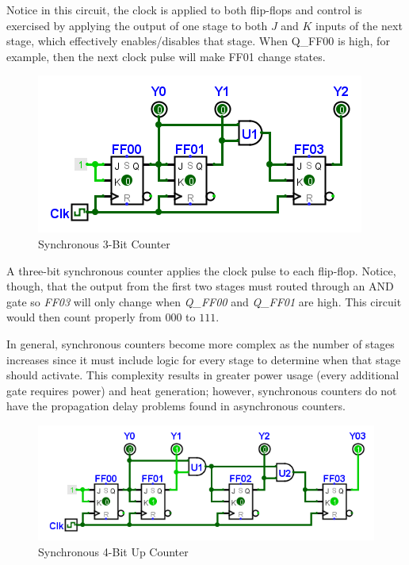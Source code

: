 Notice in this circuit, the clock is applied to both flip-flops and control is exercised by applying the output of one stage to both $ J $ and $ K $ inputs of the next stage, which effectively enables/disables that stage. When Q\_FF00 is high, for example, then the next clock pulse will make FF01 change states. 

\begin{figure}[H]
	\centering
	\includegraphics[width=\maxwidth{.95\linewidth}]{gfx/09_14}
	\caption{Synchronous 3-Bit Counter}
	\label{fig:09_14}
\end{figure}

A three-bit synchronous counter applies the clock pulse to each flip-flop. Notice, though, that the output from the first two stages must routed through an \textsf{AND} gate so \emph{FF03} will only change when \emph{Q\_FF00} and \emph{Q\_FF01} are high. This circuit would then count properly from $ 000 $ to $ 111 $. 

In general, synchronous counters become more complex as the number of stages increases since it must include logic for every stage to determine when that stage should activate. This complexity results in greater power usage (every additional gate requires power) and heat generation; however, synchronous counters do not have the propagation delay problems found in asynchronous counters. 

\begin{figure}[H]
	\centering
	\includegraphics[width=\maxwidth{.95\linewidth}]{gfx/09_15}
	\caption{Synchronous 4-Bit Up Counter}
	\label{fig:09_15}
\end{figure}

